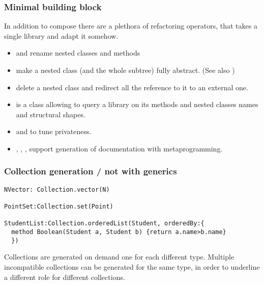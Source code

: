 \begin{frame}[fragile]
\frametitle{Minimal building block}

In addition to compose there are a plethora of \alert{refactoring} operators, that takes a single library and adapt it somehow.
\begin{itemize}
\item \Q@RenamePath@ and \Q@RenameSelector@ rename nested classes and methods
\item \Q@RemoveImplementationPath@  make a nested class (and the whole subtree) fully abstract. (See also \Q@RemoveImplementationSelector@)
\item \Q@Redirect@ delete a  nested class and redirect all the reference to it to an external one.
\item \Q@Introspect@ is a class allowing to query a library on its methods and nested classes names and structural shapes.
\item \Q@MakePrivatePath@ and \Q@MakePrivateSelector@ to tune privateness.
\item \Q@AddDocumentationPath@, \Q@AddDocumentationSelector@, \Q@RemoveDocumentationPath@, \Q@RemoveDocumentationSelector@
support generation of documentation with metaprogramming.
\end{itemize}
\end{frame}


\begin{frame}[fragile]
\frametitle{Collection generation / not with generics}
\begin{NiceCode}{59ex}{0.8}
\begin{lstlisting}
NVector: Collection.vector(N)

PointSet:Collection.set(Point)

StudentList:Collection.orderedList(Student, orderedBy:{
  method Boolean(Student a, Student b) {return a.name>b.name}
  })
\end{lstlisting}
\end{NiceCode}
Collections are generated on demand one for each different type.
Multiple incompatible collections can be generated for the same type, in order to underline a different role for different collections.
\end{frame}

